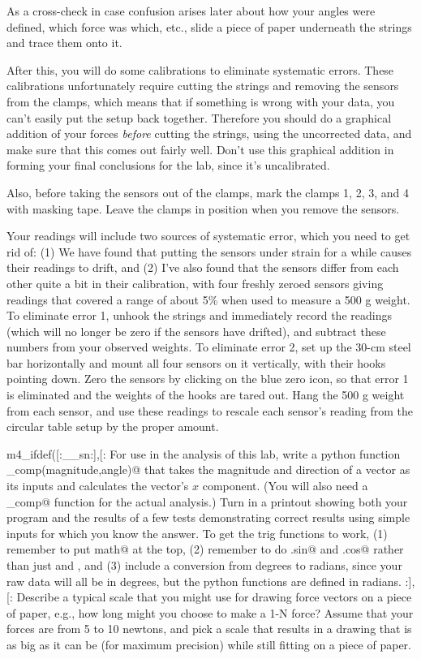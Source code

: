 As a cross-check in case confusion arises later about how your angles were defined, which
force was which, etc., slide a piece of paper underneath the strings and trace them onto it.

After this, you will do some calibrations to eliminate systematic errors. These calibrations
unfortunately require cutting the strings and removing the sensors from the clamps,
which means that if something is wrong with your
data, you can't easily put the setup back together. Therefore you should do a graphical
addition of your forces \emph{before} cutting the strings, using the uncorrected data,
and make sure that this comes out fairly well. Don't use this graphical addition in forming
your final conclusions for the lab, since it's uncalibrated.

Also, before taking the sensors out of the clamps,
mark the clamps 1, 2, 3, and 4 with masking tape. Leave the clamps in position when you remove the
sensors.

Your readings will include two sources of systematic error, which you need
to get rid of: (1) We have found that putting the
sensors under strain for a while causes their readings to drift, and (2)
I've also found that the sensors differ from each other quite a bit in their
calibration, with four freshly zeroed sensors giving readings
that covered a range of about 5\% when used to measure a 500 g weight.
To eliminate error 1, unhook the strings and immediately record the readings (which
will no longer be zero if the sensors have drifted), and subtract these
numbers from your observed weights. To eliminate error 2, set up the 30-cm steel bar
horizontally and mount all four sensors on it vertically, with their hooks pointing down.
Zero the sensors by clicking on the blue zero icon, so that error 1 is eliminated and the weights of the hooks are tared out.
Hang the 500 g weight from each sensor, and use these readings to
rescale each sensor's reading from the circular table setup by the proper amount.


\prelab

m4_ifdef([:__sn:],[:%
\prelabquestion For use in the analysis of this lab, write a python function \verb@x_comp(magnitude,angle)@ that
takes the magnitude and direction of a vector as its inputs and calculates the vector's $x$ component.
(You will also need a \verb@y_comp@ function for the actual analysis.)
Turn in a printout showing both your program and the results of a few tests demonstrating correct results
using simple inputs for which you know the answer.
To get the trig functions to work, (1) remember to put \verb@import math@ at the top, (2) remember to do \verb@math.sin@
and \verb@math.cos@ rather than just \verb@sin@ and \verb@cos@, and (3) include a conversion from degrees to radians, since
your raw data will all be in degrees, but the python functions are defined in radians.
:],[:%
\prelabquestion  Describe a typical scale that you might use for drawing
force vectors on a piece of paper, e.g., how long might you
choose to make a 1-N force?  Assume that your forces are
from 5 to 10 newtons, and pick a scale that results in a drawing that
is as big as it can be (for maximum precision) while still fitting on
a piece of paper.

